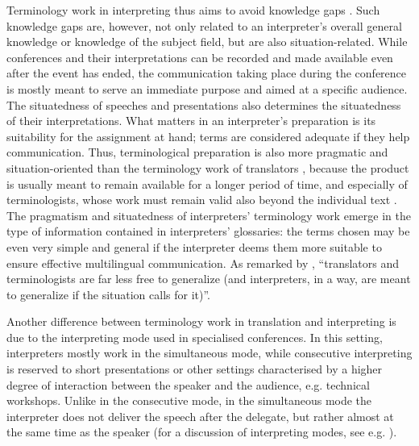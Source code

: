 Terminology work in interpreting thus aims to avoid knowledge gaps \citep[25]{rutten2008zielgerichtet}. Such knowledge gaps are, however, not only related to an interpreter's overall general knowledge or knowledge of the subject field, but are also situation-related. While conferences and their interpretations can be recorded and made available even after the event has ended, the communication taking place during the conference is mostly meant to serve an immediate purpose and aimed at a specific audience. The situatedness of speeches and presentations also determines the situatedness of their interpretations. What matters in an interpreter's preparation is its suitability for the assignment at hand; terms are considered adequate if they help communication. Thus, terminological preparation is also more pragmatic and situation-oriented than the terminology work of translators \citep{rutten2012pragmatik}, because the product is usually meant to remain available for a longer period of time, and especially of terminologists, whose work must remain valid also beyond the individual text \citep[49]{rutten2013TM}. The pragmatism and situatedness of interpreters' terminology work emerge in the type of information contained in interpreters' glossaries: the terms chosen may be even very simple and general if the interpreter deems them more suitable to ensure effective multilingual communication. As remarked by \citet[43]{rutten2012TM}, ``translators and terminologists are far less free to generalize (and interpreters, in a way, are meant to generalize if the situation calls for it)''.

Another difference between terminology work in translation and interpreting is due to the interpreting mode used in specialised conferences. In this setting, interpreters mostly work in the simultaneous mode, while consecutive interpreting is reserved to short presentations or other settings characterised by a higher degree of interaction between the speaker and the audience, e.g. technical workshops. Unlike in the consecutive mode, in the simultaneous mode the interpreter does not deliver the speech after the delegate, but rather almost at the same time as the speaker (for a discussion of interpreting modes, see e.g. \citealt{pochhacker2015routledge}).

